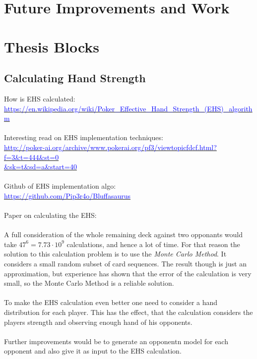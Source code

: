 \chapter{Future Improvements and Work}

\chapter{Thesis Blocks}
\section{Calculating Hand Strength}
How is EHS calculated: \\
\href{https://en.wikipedia.org/wiki/Poker\_Effective\_Hand\_Strength\_(EHS)\_algorithm}{\textcolor{blue}{https://en.wikipedia.org/wiki/Poker\_Effective\_Hand\_Strength\_(EHS)\_algorithm}} \\\\
Interesting read on EHS implementation techniques:\\
\href{http://poker-ai.org/archive/www.pokerai.org/pf3/viewtopicfdcf.html?f=3\&t=444\&st=0\&sk=t\&sd=a\&start=40}{\textcolor{blue}{http://poker-ai.org/archive/www.pokerai.org/pf3/viewtopicfdcf.html?f=3\&t=444\&st=0 \\ \&sk=t\&sd=a\&start=40}} \\\\
Github of EHS implementation algo:\\
\href{https://github.com/Pip3r4o/Bluffasaurus}{\textcolor{blue}{https://github.com/Pip3r4o/Bluffasaurus}} \\\\
Paper on calculating the EHS: \cite{ehs_calc} \\\\

A full consideration of the whole remaining deck against two opponants would take $47^6 = 7.73 \cdot 10^9$ calculations, and hence a lot of time. For that reason the solution to this calculation problem is to use the \textit{Monte Carlo Method}. It considers a small random subset of card sequences. The result though is just an approximation, but experience has shown that the error of the calculation is very small, so the Monte Carlo Method is a reliable solution. \cite{ehs_calc}\\\\

To make the EHS calculation even better one need to consider a hand distribution for each player. This has the effect, that the calculation considers the players strength and observing enough hand of his opponents.\\\\
Further improvements would be to generate an opponentn model for each opponent and also give it as input to the EHS calculation.

